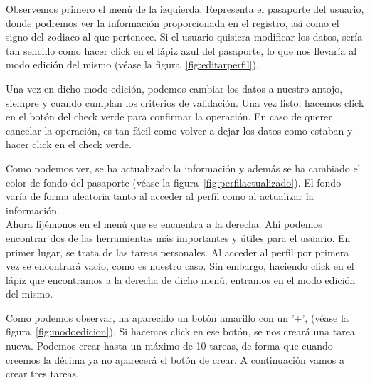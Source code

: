 
Observemos primero el menú de la izquierda. Representa el pasaporte del usuario, donde podremos ver la información proporcionada en el registro, así como el signo del zodiaco al que pertenece. Si el usuario quisiera modificar los datos, sería tan sencillo como hacer click en el lápiz azul del pasaporte, lo que nos llevaría al modo edición del mismo {(v\'ease la figura~\ref{fig:editarperfil})}.\\


\clearpage

Una vez en dicho modo edición, podemos cambiar los datos a nuestro antojo, siempre y cuando cumplan los criterios de validación. Una vez listo, hacemos click en el botón del check verde para confirmar la operación. En caso de querer cancelar la operación, es tan fácil como volver a dejar los datos como estaban y hacer click en el check verde.\\


Como podemos ver, se ha actualizado la información y además se ha cambiado el color de fondo del pasaporte {(v\'ease la figura~\ref{fig:perfilactualizado})}. El fondo varía de forma aleatoria tanto al acceder al perfil como al actualizar la información.\\

Ahora fijémonos en el menú que se encuentra a la derecha. Ahí podemos encontrar dos de las herramientas más importantes y útiles para el usuario. En primer lugar, se trata de las tareas personales. Al acceder al perfil por primera vez se encontrará vacío, como es nuestro caso. Sin embargo, haciendo click en el lápiz que encontramos a la derecha de dicho menú, entramos en el modo edición del mismo.\\


Como podemos observar, ha aparecido un botón amarillo con un '+', {(v\'ease la figura~\ref{fig:modoedicion})}. Si hacemos click en ese botón, se nos creará una tarea nueva. Podemos crear hasta un máximo de 10 tareas, de forma que cuando creemos la décima ya no aparecerá el botón de crear. A continuación vamos a crear tres tareas.\\

